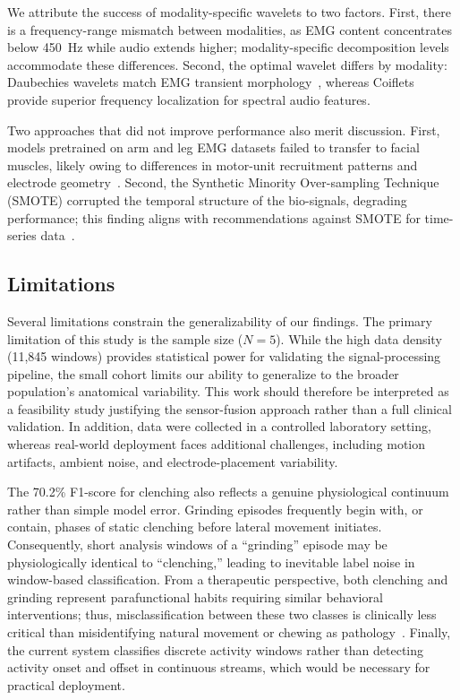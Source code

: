 \documentclass[pdflatex,sn-nature,iicol]{sn-jnl}
\begin{document}
We attribute the success of modality-specific wavelets to two factors. First, there is a frequency-range mismatch between modalities, as EMG content concentrates below 450~Hz while audio extends higher; modality-specific decomposition levels accommodate these differences. Second, the optimal wavelet differs by modality: Daubechies wavelets match EMG transient morphology~\cite{englehart2003robust}, whereas Coiflets provide superior frequency localization for spectral audio features.

Two approaches that did not improve performance also merit discussion. First, models pretrained on arm and leg EMG datasets failed to transfer to facial muscles, likely owing to differences in motor-unit recruitment patterns and electrode geometry~\cite{jiang2012myoelectric}. Second, the Synthetic Minority Over-sampling Technique (SMOTE) corrupted the temporal structure of the bio-signals, degrading performance; this finding aligns with recommendations against SMOTE for time-series data~\cite{johnson2019survey}.

\subsection{Limitations}
Several limitations constrain the generalizability of our findings. The primary limitation of this study is the sample size ($N=5$). While the high data density (11,845 windows) provides statistical power for validating the signal-processing pipeline, the small cohort limits our ability to generalize to the broader population's anatomical variability. This work should therefore be interpreted as a feasibility study justifying the sensor-fusion approach rather than a full clinical validation. In addition, data were collected in a controlled laboratory setting, whereas real-world deployment faces additional challenges, including motion artifacts, ambient noise, and electrode-placement variability.

The 70.2\% F1-score for clenching also reflects a genuine physiological continuum rather than simple model error. Grinding episodes frequently begin with, or contain, phases of static clenching before lateral movement initiates. Consequently, short analysis windows of a ``grinding'' episode may be physiologically identical to ``clenching,'' leading to inevitable label noise in window-based classification. From a therapeutic perspective, both clenching and grinding represent parafunctional habits requiring similar behavioral interventions; thus, misclassification between these two classes is clinically less critical than misidentifying natural movement or chewing as pathology~\cite{lobbezoo2018international}. Finally, the current system classifies discrete activity windows rather than detecting activity onset and offset in continuous streams, which would be necessary for practical deployment.
\end{document}

